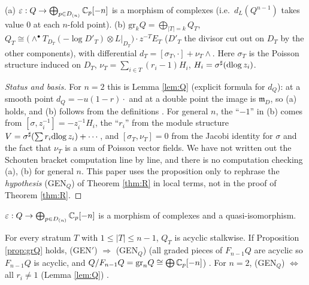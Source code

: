 \begin{prop}\label{prop:grQ}
(a) $\varepsilon:Q\to\bigoplus_{p\in D_{(n)}}\mathbb C_p[-n]$ is a morphism of complexes (i.e.\ $d_L(Q^{n-1})$ takes value 0 at each $n$-fold point).
(b) $\mathrm{gr}_kQ=\bigoplus_{|T|=k}Q_T$, $Q_T\cong\bigl(\wedge^\bullet T_{D_T}(-\log D'_T)\otimes L|_{D_T}\bigr)\cdot z^{-T}E_T$ ($D'_T$ the divisor cut out on $D_T$ by the other components), with differential $d_T=[\sigma_T,\cdot]+\nu_T\wedge$. Here $\sigma_T$ is the Poisson structure induced on $D_T$, $\nu_T=\sum_{i\in T}(r_i-1)H_i$, $H_i=\sigma^\sharp(\mathrm{dlog}\, z_i)$.
\end{prop}
\begin{proof}[Status and basis]
For $n=2$ this is Lemma \ref{lem:Q} (explicit formula for $d_Q$): at a smooth point $d_Q=-u(1-r)\cdot$ and at a double point the image is $\mathfrak m_D$, so (a) holds, and (b) follows from the definitions \tP \tV. For general $n$, the ``$-1$'' in (b) comes from $[\sigma,z_i^{-1}]=-z_i^{-1}H_i$, the ``$r_i$'' from the module structure $V=\sigma^\sharp(\sum r_i\mathrm{dlog}\, z_i)+\cdots$, and $[\sigma_T,\nu_T]=0$ from the Jacobi identity for $\sigma$ and the fact that $\nu_T$ is a sum of Poisson vector fields. We have not written out the Schouten bracket computation line by line, and there is no computation checking (a), (b) for general $n$. This paper uses the proposition only to rephrase the \emph{hypothesis} (GEN$_Q$) of Theorem \ref{thm:R} in local terms, not in the proof of Theorem \ref{thm:R}. \tQ
\end{proof}

\begin{defn}\label{defn:GEN}
$\varepsilon:Q\to\bigoplus_{p\in D_{(n)}}\mathbb C_p[-n]$ is a morphism of complexes and a quasi-isomorphism.
\end{defn}
\begin{defn}
For every stratum $T$ with $1\le|T|\le n-1$, $Q_T$ is acyclic stalkwise. If Proposition \ref{prop:grQ} holds, (GEN$'$) $\Rightarrow$ (GEN$_Q$) (all graded pieces of $F_{n-1}Q$ are acyclic so $F_{n-1}Q$ is acyclic, and $Q/F_{n-1}Q=\mathrm{gr}_nQ\cong\bigoplus\mathbb C_p[-n]$) \tQ. For $n=2$, (GEN$_Q$) $\iff$ all $r_i\ne1$ (Lemma \ref{lem:Q}) \tP.
\end{defn}

